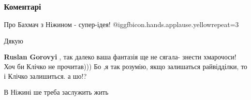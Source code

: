  
 
 
 
 
\subsubsection{Коментарі}
\label{sec:10_09_2021.fb.gorovyj_ruslan.1.2091_kiev.cmt}

\begin{itemize}
 
Про Бахмач з Ніжином - супер-ідея!  @igg{fbicon.hands.applause.yellow}{repeat=3} 

 
Дякую

 
\textbf{Ruslan Gorovyi} , так далеко ваша фантазія ще не сягала- знести хмарочоси!
Хоч би Клічко не прочитав))) Бо ,я так розумію, якщо залишаться райвідділки, то і Клічко залишиться. а шо!?

 
В Ніжині ше треба заслужить жить

 

\end{itemize}
